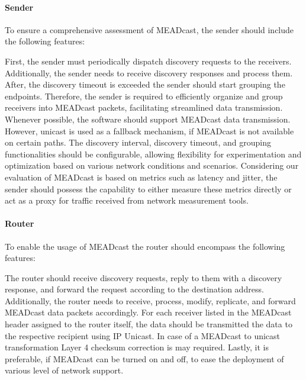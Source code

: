 \paragraph{Sender} %
\label{par:Sender}
To ensure a comprehensive assessment of MEADcast, the sender should include the
    following features:

First, the sender must periodically dispatch discovery requests to the
    receivers.
Additionally, the sender needs to receive discovery responses and process them.
After, the discovery timeout is exceeded the sender should start grouping the
    endpoints.
Therefore, the sender is required to efficiently organize and group receivers
    into MEADcast packets, facilitating streamlined data transmission.
Whenever possible, the software should support MEADcast data transmission.
However, unicast is used as a fallback mechanism, if MEADcast is not available
    on certain paths.
The discovery interval, discovery timeout, and grouping functionalities should
    be configurable, allowing flexibility for experimentation and optimization
    based on various network conditions and scenarios.
Considering our evaluation of MEADcast is based on metrics such as latency and
    jitter, the sender should possess the capability to either measure these
    metrics directly or act as a proxy for traffic received from network
    measurement tools.

\paragraph{Router} %
\label{par:Router}
To enable the usage of MEADcast the router should encompass the following
    features:

The router should receive discovery requests, reply to them with a discovery
    response, and forward the request according to the destination address.
Additionally, the router needs to receive, process, modify, replicate, and
    forward MEADcast data packets accordingly.
For each receiver listed in the MEADcast header assigned to the router itself,
    the data should be transmitted the data to the respective recipient using
    IP Unicast.
In case of a MEADcast to unicast transformation Layer 4 checksum correction is
    may required.
Lastly, it is preferable, if MEADcast can be turned on and off, to ease the
    deployment of various level of network support.

